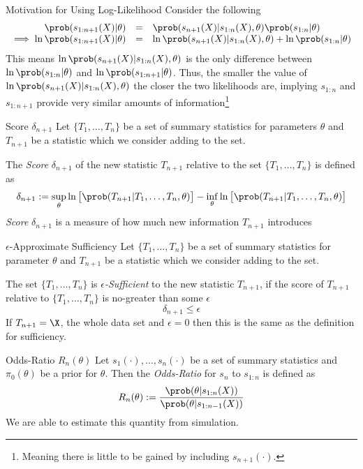 \documentclass[11pt,a4paper]{article}
\begin{document}
  \begin{remark}{Motivation for Using Log-Likelihood}
    Consider the following
    \[\begin{array}{rcl}
      \prob(s_{1:n+1}(X)|\theta)&=&\prob(s_{n+1}(X)|s_{1:n}(X),\theta)\prob(s_{1:n}|\theta)\\
      \implies\ln\prob(s_{1:n+1}(X)|\theta)&=&\ln\prob(s_{n+1}(X)|s_{1:n}(X),\theta)+\ln\prob(s_{1:n}|\theta)
    \end{array}\]
    This means $\ln\prob(s_{n+1}(X)|s_{1:n}(X),\theta)$ is the only difference between $\ln\prob(s_{1:n}|\theta)$ and $\ln\prob(s_{1:n+1}|\theta)$. Thus, the smaller the value of $\ln\prob(s_{n+1}(X)|s_{1:n}(X),\theta)$ the closer the two likelihoods are, implying $s_{1:n}$ and $s_{1:n+1}$  provide very similar amounts of information\footnote{Meaning there is little to be gained by including $s_{n+1}(\cdot)$.}
  \end{remark}

  \begin{definition}{Score $\delta_{n+1}$\cite{ABC_Approximately_Sufficient_Statistics}}
    Let $\{T_1,\dots,T_n\}$ be a set of summary statistics for parameters $\theta$ and $T_{n+1}$ be a statistic which we consider adding to the set.
    \par The \textit{Score} $\delta_{n+1}$ of the new statistic $T_{n+1}$ relative to the set $\{T_1,\dots,T_n\}$ is defined as
    \[ \delta_{n+1}:=\sup_\theta\ln\big[\prob(T_{n+1}|T_1,\dots,T_n,\theta)\big]-\inf_\theta\ln\big[\prob(T_{n+1}|T_1,\dots,T_n,\theta)\big] \]
    \textit{Score} $\delta_{n+1}$ is a measure of how much new information $T_{n+1}$ introduces
  \end{definition}

  \begin{definition}{$\epsilon$-Approximate Sufficiency \cite{ABC_Approximately_Sufficient_Statistics}}
    Let $\{T_1,\dots,T_n\}$ be a set of summary statistics for parameter $\theta$ and $T_{n+1}$ be a statistic which we consider adding to the set.
    \par The set $\{T_1,\dots,T_n\}$ is \textit{$\epsilon$-Sufficient} to the new statistic $T_{n+1}$, if the score of $T_{n+1}$ relative to $\{T_1,\dots,T_n\}$ is no-greater than some $\epsilon$
    \[ \delta_{n+1}\leq\epsilon \]
    If $T_{n+1}=\X$, the whole data set and $\epsilon=0$ then this is the same as the definition for sufficiency.
  \end{definition}

  \begin{definition}{Odds-Ratio $R_n(\theta)$}
    Let $s_{1}(\cdot),\dots,s_n(\cdot)$ be a set of summary statistics and $\pi_0(\theta)$ be a prior for $\theta$. Then the \textit{Odds-Ratio} for $s_n$ to $s_{1:n}$ is defined as
    \[ R_n(\theta):=\frac{\prob(\theta|s_{1:n}(X))}{\prob(\theta|s_{1:n-1}(X))} \]
    We are able to estimate this quantity from simulation.
  \end{definition}
\end{document}
